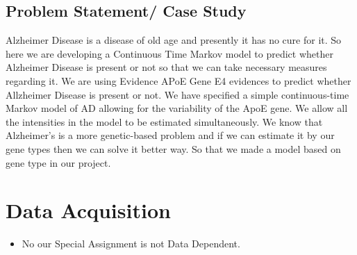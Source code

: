 \documentclass{article}
\begin{document}
\subsection{Problem Statement/ Case Study}
Alzheimer Disease is a disease of old age and presently it has no cure for it. So here we are developing a Continuous Time Markov model to predict whether Alzheimer Disease is present or not so that we can take necessary measures regarding it. We are using Evidence \cite{4} APoE Gene E4 evidences to predict whether Allzheimer Disease is present or not. We have specified a simple continuous-time Markov model of AD allowing for the variability of the ApoE gene. We allow all the intensities in the model to be estimated simultaneously. We know that Alzheimer's is a more genetic-based problem and if we can estimate it by our gene types then we can solve it better way. So that we made a model based on gene type in our project.

\begin{itemize}
    
\end{itemize}

\section{Data Acquisition }

\begin{itemize}
    \item No our Special Assignment is not Data Dependent.
\end{itemize}
\end{document}
